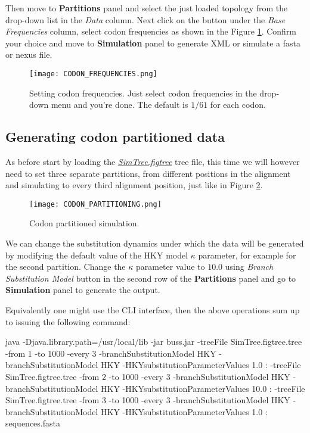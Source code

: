 Then move to \textbf{Partitions} panel and select the just loaded topology from the drop-down list in the \emph{Data} column. 
Next click on the button under the \emph{Base Frequencies} column, select codon frequencies as shown in the Figure \ref{fig:CodonFrequencies}.
Confirm your choice and move to \textbf{Simulation} panel to generate XML or simulate a fasta or nexus file.

\begin{figure}[H]
\begin{center}
\texttt{[image: CODON\_FREQUENCIES.png]} 
\end{center}
\caption{
Setting codon frequencies. Just select codon frequencies in the drop-down menu and you're done. The default is $1/61$ for each codon.
} %
\label{fig:CodonFrequencies}
\end{figure}

\subsection{Generating codon partitioned data}
As before start by loading the \href{http://rega.kuleuven.be/cev/ecv/software/buss_files/simtree.figtree}{\emph{SimTree.figtree}} tree file, this time we will however need to set three separate partitions, from different positions in the alignment and simulating to every third alignment position, just like in Figure \ref{fig:CodonPartitoning}.

\begin{figure}[H]
\begin{center}
\texttt{[image: CODON\_PARTITIONING.png]} 
\end{center}
\caption{
Codon partitioned simulation.
} %
\label{fig:CodonPartitoning}
\end{figure}

We can change the substitution dynamics under which the data will be generated by modifying the default value of the HKY model $\kappa$ parameter, for example for the second partition.
Change the $\kappa$ parameter value to $10.0$ using \emph{Branch Substitution Model} button in the second row of the \textbf{Partitions} panel and go to \textbf{Simulation} panel to generate the output.

Equivalently one might use the CLI interface, then the above operations sum up to issuing the following command:

\begin{code}
java -Djava.library.path=/usr/local/lib -jar buss.jar 
-treeFile SimTree.figtree.tree -from 1 -to 1000 -every 3 -branchSubstitutionModel HKY -branchSubstitutionModel HKY -HKYsubstitutionParameterValues 1.0 :
-treeFile SimTree.figtree.tree -from 2 -to 1000 -every 3 -branchSubstitutionModel HKY -branchSubstitutionModel HKY -HKYsubstitutionParameterValues 10.0 :
-treeFile SimTree.figtree.tree -from 3 -to 1000 -every 3 -branchSubstitutionModel HKY -branchSubstitutionModel HKY -HKYsubstitutionParameterValues 1.0 :
sequences.fasta
\end{code}

